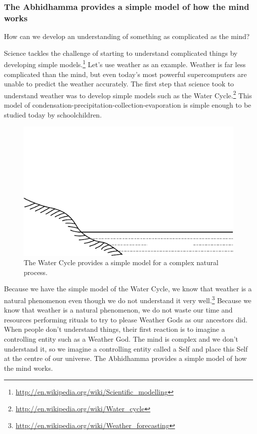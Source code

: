 \subsubsection*{The Abhidhamma provides a simple model of how the mind works}

How can we develop an understanding of something as complicated as the mind? 

Science tackles the challenge of starting to understand complicated things by developing simple models.\footnote{\url{http://en.wikipedia.org/wiki/Scientific_modelling}} Let’s use weather as an example. Weather is far less complicated than the mind, but even today’s most powerful supercomputers are unable to predict the weather accurately. The first step that science took to understand weather was to develop simple models such as the Water Cycle.\footnote{\url{http://en.wikipedia.org/wiki/Water_cycle}} This model of condensation-precipitation-collection-evaporation is simple enough to be studied today by schoolchildren.

\begin{figure}[h]
\centering
\includegraphics[width=0.85\linewidth]{./Diagrams/Rain}
\caption{The Water Cycle provides a simple model for a complex natural process.}
\label{fig:Rain}
\end{figure}

Because we have the simple model of the Water Cycle, we know that weather is a natural phenomenon even though we do not understand it very well.\footnote{\url{http://en.wikipedia.org/wiki/Weather_forecasting}} Because we know that weather is a natural phenomenon, we do not waste our time and resources performing rituals to try to please Weather Gods as our ancestors did. When people don’t understand things, their first reaction is to imagine a controlling entity such as a Weather God. The mind is complex and we don’t understand it, so we imagine a controlling entity called a Self and place this Self at the centre of our universe. The Abhidhamma provides a simple model of how the mind works.

